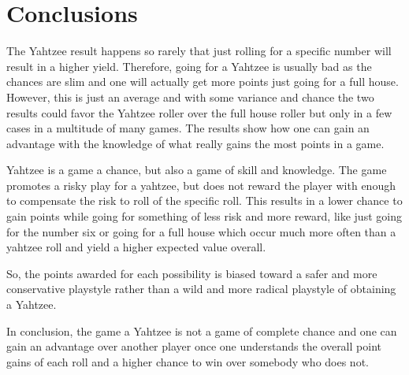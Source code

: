 \section{Conclusions}

The Yahtzee result happens so rarely that just rolling for a specific number
will result in a higher yield. Therefore, going for a Yahtzee is usually bad as
the chances are slim and one will actually get more points just going for a full
house.  However, this is just an average and with some variance and chance the
two results could favor the Yahtzee roller over the full house roller but only
in a few cases in a multitude of many games.  The results show how one can gain
an advantage with the knowledge of what really gains the most points in a game.

Yahtzee is a game a chance, but also a game of skill and knowledge. The game
promotes a risky play for a yahtzee, but does not reward the player with enough
to compensate the risk to roll of the specific roll. This results in a lower
chance to gain points while going for something of less risk and more reward,
like just going for the number six or going for a full house which occur
much more often than a yahtzee roll and yield a higher expected value overall.

So, the points awarded for each possibility is biased toward a safer and more
conservative playstyle rather than a wild and more radical playstyle of
obtaining a Yahtzee.

In conclusion, the game a Yahtzee is not a game of complete chance and one can
gain an advantage over another player once one understands the overall point
gains of each roll and a higher chance to win over somebody who does not.

